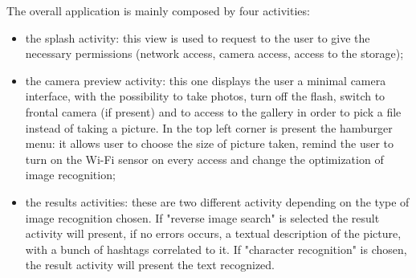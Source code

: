 The overall application is mainly composed by four activities:
\begin{itemize}
	\item the splash activity: this view is used to request to the user to give 
		  the necessary permissions (network access, camera access, access to 
		  the storage);
	\item the camera preview activity: this one displays the user a minimal 
	      camera interface, with the possibility to take photos, turn off the 
	      flash, switch to frontal camera (if present) and to access to the 
	      gallery in order to pick a file instead of taking a picture. In the 
	      top left corner is present the hamburger menu: it allows user to 
	      choose the size of picture taken, remind the user to turn on the Wi-Fi 
	      sensor on every access and change the optimization of image recognition;
	\item the results activities: these are two different activity depending on 
	      the type of image recognition chosen. If "reverse image search" is 
	      selected the result activity will present, if no errors occurs, a 
	      textual description of the picture, with a bunch of hashtags correlated
	      to it. If "character recognition" is chosen, the result activity will 
	      present the text recognized.
\end{itemize}
